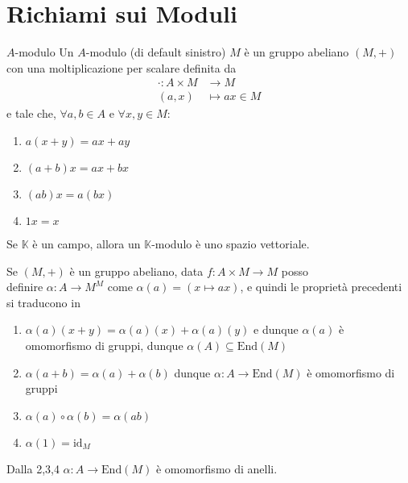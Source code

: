 \section{Richiami sui Moduli}
\begin{definition}{\(A\)-modulo}
    Un \(A\)-modulo (di default sinistro) \(M\) è un gruppo abeliano \({(M, +)}\) con una
    moltiplicazione per scalare definita da 
    \begin{align*}
        \cdot : A\times M &\longrightarrow M \\
        {(a,x)}&\longmapsto ax \in M
    \end{align*}
    e tale che, \(\forall a,b \in A\) e \(\forall x,y \in M\):
\begin{enumerate}[label = \arabic*)]
    \item \(a{(x+y)} = ax + ay\) 
    \item \({(a+b)}x = ax + bx\) 
    \item \({(ab)}x = a{(bx)}\) 
    \item \(1x = x\) 
\end{enumerate}
\end{definition}
\begin{remark}{}
    Se \(\mathbb{K}\) è un campo, allora un \(\mathbb{K}\)-modulo è uno spazio
    vettoriale.
\end{remark}
\begin{remark}{}
    Se \({(M, +)}\) è un gruppo abeliano, data \(f : A \times  M \to M\) posso
    \\ definire \(\alpha : A \to M^{M}\) come \(\alpha{(a)} = (x \mapsto ax)\),
    e quindi le proprietà precedenti si traducono in 
\begin{enumerate}[label = \arabic*.]
    \item \(\alpha{(a)}{(x+y)} = \alpha{(a)}{(x)} + \alpha{(a)}{(y)}\) e dunque
        \(\alpha{(a)}\) è omomorfismo di gruppi, dunque \(\alpha{(A)} \subseteq \mathrm{End}{(M)}\) 
    \item \(\alpha{(a+b)} = \alpha{(a)}+\alpha{(b)}\) dunque \(\alpha : A \to \mathrm{End}{(M)}\) è omomorfismo di gruppi
    \item \(\alpha{(a)}\circ \alpha{(b)} = \alpha{(ab)}\) 
    \item \(\alpha{(1)} = \mathrm{id}_M\) 
\end{enumerate}
Dalla 2,3,4 \(\alpha : A \to \mathrm{End}{(M)}\) è omomorfismo di anelli.
\end{remark}


